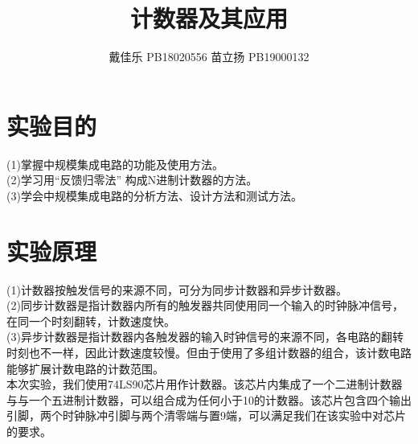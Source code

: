 \documentclass[a4paper,11pt,UTF8]{ctexart}
\title{计数器及其应用}
\author{戴佳乐 \quad PB18020556 \quad 苗立扬 \quad PB19000132}
\begin{document}
\maketitle


%
\newcommand{\p}{\par}
\newcommand{\np}{\par\noindent}
%
\newcommand{\expa}{分别验证74LS90实现2、5、10进制计数器}
\newcommand{\expb}{用一块74LS90实现8进制的计数器}
\newcommand{\expc}{用两块74LS90实现100进制的计数器}
\newcommand{\expd}{用两块74LS90实现60进制的计数器（数字钟计数）}
\newcommand{\chip}{数据选择器74LS151}

\newcommand{\CI}{C\negthinspace I}
\newcommand{\CO}{C\negthinspace O}
%

\section{实验目的}

(1)掌握中规模集成电路的功能及使用方法。\\
(2)学习用“反馈归零法” 构成N进制计数器的方法。\\
(3)学会中规模集成电路的分析方法、设计方法和测试方法。\\



\section{实验原理}
(1)计数器按触发信号的来源不同，可分为同步计数器和异步计数器。\\
(2)同步计数器是指计数器内所有的触发器共同使用同一个输入的时钟脉冲信号，在同一个时刻翻转，计数速度快。\\
(3)异步计数器是指计数器内各触发器的输入时钟信号的来源不同，各电路的翻转时刻也不一样，因此计数速度较慢。但由于使用了多组计数器的组合，该计数电路能够扩展计数电路的计数范围。\\

本次实验，我们使用74LS90芯片用作计数器。该芯片内集成了一个二进制计数器与与一个五进制计数器，可以组合成为任何小于10的计数器。该芯片包含四个输出引脚，两个时钟脉冲引脚与两个清零端与置9端，可以满足我们在该实验中对芯片的要求。
\end{document}
